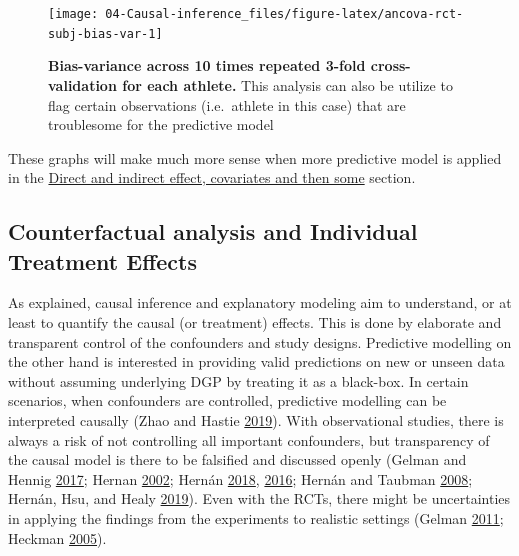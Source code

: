 \documentclass[
]{book}
\begin{document}
\begin{figure}

{\centering \texttt{[image: 04-Causal-inference\_files/figure-latex/ancova-rct-subj-bias-var-1]} 

}

\caption{\textbf{Bias-variance across 10 times repeated 3-fold cross-validation for each athlete. } This analysis can also be utilize to flag certain observations (i.e.~athlete in this case) that are troublesome for the predictive model}\label{fig:ancova-rct-subj-bias-var}
\end{figure}



These graphs will make much more sense when more predictive model is applied in the \protect\hyperlink{direct-and-indirect-effect-covariates-and-then-some}{Direct and indirect effect, covariates and then some} section.

\hypertarget{counterfactual-analysis-and-individual-treatment-effects}{%
\subsection{Counterfactual analysis and Individual Treatment Effects}\label{counterfactual-analysis-and-individual-treatment-effects}}

As explained, causal inference and explanatory modeling aim to understand, or at least to quantify the causal (or treatment) effects. This is done by elaborate and transparent control of the confounders and study designs. Predictive modelling on the other hand is interested in providing valid predictions on new or unseen data without assuming underlying DGP by treating it as a black-box. In certain scenarios, when confounders are controlled, predictive modelling can be interpreted causally (Zhao and Hastie \protect\hyperlink{ref-zhaoCausalInterpretationsBlackBox2019}{2019}). With observational studies, there is always a risk of not controlling all important confounders, but transparency of the causal model is there to be falsified and discussed openly (Gelman and Hennig \protect\hyperlink{ref-gelmanSubjectiveObjectiveStatistics2017}{2017}; Hernan \protect\hyperlink{ref-hernanCausalKnowledgePrerequisite2002}{2002}; Hernán \protect\hyperlink{ref-hernanCWordScientificEuphemisms2018}{2018}, \protect\hyperlink{ref-hernanDoesWaterKill2016}{2016}; Hernán and Taubman \protect\hyperlink{ref-hernanDoesObesityShorten2008}{2008}; Hernán, Hsu, and Healy \protect\hyperlink{ref-hernanSecondChanceGet2019}{2019}). Even with the RCTs, there might be uncertainties in applying the findings from the experiments to realistic settings (Gelman \protect\hyperlink{ref-gelmanCausalityStatisticalLearning2011}{2011}; Heckman \protect\hyperlink{ref-heckmanRejoinderResponseSobel2005}{2005}).
\end{document}

